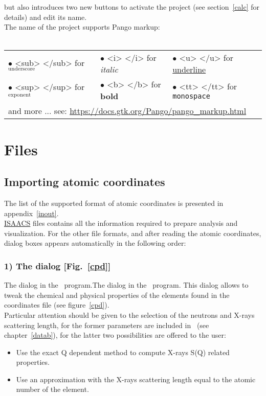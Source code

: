 but also introduces two new buttons to activate the project (see section~\ref{calc} for details) and edit its name.\\ 
\laf The name of the project supports Pango markup\cite{pangomarkup}: \\
\\
{\small{
\begin{tabular}{p{5cm}p{5cm}p{5cm}}
$\bullet$ <sub> </sub> for $_{\text{underscore}}$ & $\bullet$ <i> </i> for {\it{italic}} & $\bullet$ <u> </u> for {\uline{underline}} \\[0.25cm]
$\bullet$ <sup> </sup> for $^{\text{exponent}}$ & $\bullet$ <b> </b> for {\bf{bold}} & $\bullet$ <tt> </tt> for {\texttt{monospace}} \\[0.25cm]
\multicolumn{3}{l}{and more ... see: \href{https://docs.gtk.org/Pango/pango\_markup.html}{https://docs.gtk.org/Pango/pango\_markup.html}}\\[0.25cm]
\end{tabular}
}}

\section{Files}

\subsection{Importing atomic coordinates}
\label{import}

The list of the supported format of atomic coordinates is presented in appendix~\ref{inout}. \\ 
\href{https://isaacs.sourceforge.net}{ISAACS} files contains all the information required to prepare analysis and visualization. 
For the other file formats, and after reading the atomic coordinates, dialog boxes appears automatically in the following order:
\subsubsection*{1) The  dialog [Fig.~\ref{cpd}]}
{The  dialog in the \atomes\ program.}{The  dialog in the \atomes\ program.}
This dialog allows to tweak the chemical and physical properties of the elements found in the coordinates file (see figure~\ref{cpd}). \\
Particular attention should be given to the selection of the neutrons and X-rays scattering length, 
for the former parameters are included in \atomes\ (see chapter~\ref{datab}), 
for the latter two possibilities are offered to the user:
\begin{itemize}
\item Use the exact Q dependent method to compute X-rays S(Q) related properties.
\item Use an approximation with the X-rays scattering length equal to the atomic number of the element.
\end{itemize}
